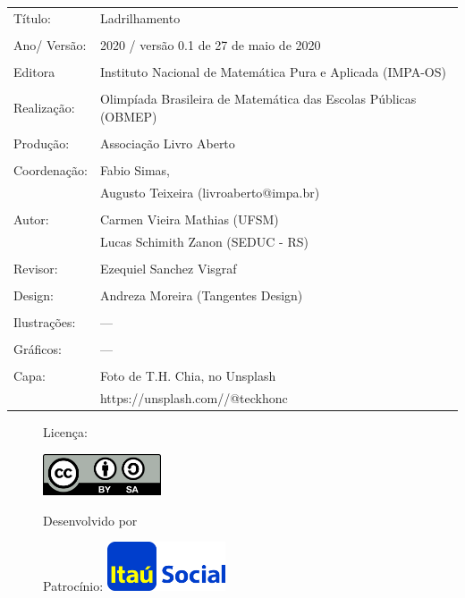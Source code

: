 \begin{tabular}{p{}p{}}
Título: & Ladrilhamento\\
\\
Ano/ Versão: & 2020 / versão 0.1 de 27 de maio de 2020\\
\\
Editora & Instituto Nacional de Matem\'atica Pura e Aplicada (IMPA-OS)\\
\\
Realização:& Olimp\'iada Brasileira de Matem\'atica das Escolas P\'ublicas (OBMEP)\\
\\
Produção:& Associação Livro Aberto\\
\\
Coordenação: & Fabio Simas, \\
			&  Augusto Teixeira (livroaberto@impa.br)\\
\\
  Autor: & Carmen Vieira Mathias (UFSM) \\
         & Lucas Schimith Zanon (SEDUC - RS) \\
\\
Revisor: & Ezequiel Sanchez Visgraf  \\
\\
Design: & Andreza Moreira (Tangentes Design) \\
\\
  Ilustrações: & --- \\ 
\\
Gráficos: & --- \\
\\
  Capa: & Foto de T.H. Chia, no Unsplash \\
  		& https://unsplash.com//@teckhonc \\

\end{tabular}


\begin{figure}[b]
\begin{minipage}[l]{5cm}
\centering

{\large Licença:}

  \includegraphics[width=3.5cm]{Figuras/cc-by-sa}
\end{minipage}\hfill
\begin{minipage}[c]{5cm}
\centering
{\large Desenvolvido por}



{\large Patrocínio:}
  \vspace{1em}
  \includegraphics[width=3.5cm]{itau}
\end{minipage}
\end{figure}


